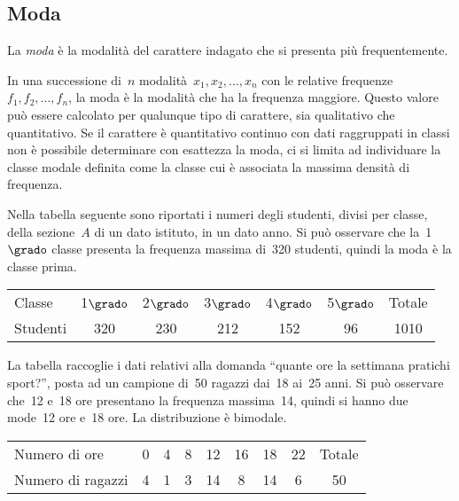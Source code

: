 \subsection{Moda}

\begin{definizione}
La \emph{moda} è la modalità del carattere indagato che si presenta più 
frequentemente.
\end{definizione}

In una successione di~\(n\) modalità~\(x_1, x_2, \ldots, x_n\)
con le relative frequenze~\(f_1, f_2, \ldots, f_n\), la moda è la modalità 
che ha la frequenza maggiore.
Questo valore può essere calcolato per qualunque tipo di carattere, sia 
qualitativo che quantitativo.
Se il carattere è quantitativo continuo con dati raggruppati in classi non 
è possibile determinare con esattezza la moda, ci si limita
ad individuare la classe modale definita come la classe cui è associata la 
massima densità di frequenza.

 \begin{esempio}

 Nella tabella seguente sono riportati i numeri degli studenti, divisi per 
classe, della sezione~\(A\) di un dato istituto,
 in un dato anno. Si può osservare che la~1\(\grado\) classe presenta la 
frequenza massima di~320 studenti, quindi la moda è la classe prima.
\begin{center}
\begin{tabular}{lcccccc}
\toprule
Classe & 1\(\grado\) & 2\(\grado\) & 3\(\grado\) & 4\(\grado\) & 5\(\grado\) & Totale 
\\
Studenti & 320 & 230 & 212 & 152 & 96 & 1010 \\
\bottomrule
\end{tabular}
\end{center}
 \end{esempio}

\begin{esempio}
La tabella raccoglie i dati relativi alla domanda ``quante ore la settimana 
pratichi sport?'', posta ad un
campione di~50 ragazzi dai~18 ai~25 anni. Si può osservare che~12 e~18 ore 
presentano la frequenza massima~14, quindi si hanno due
mode~12 ore e~18 ore. La distribuzione è bimodale.


\begin{center}
\begin{tabular}{lcccccccc}
\toprule
Numero di ore & 0 &4 &8 &12 &16 &18 &22 &Totale\\
 Numero di ragazzi& 4 & 1 & 3 & 14 & 8 & 14 & 6 & 50 \\
\bottomrule
\end{tabular}
\end{center}
 \end{esempio}

